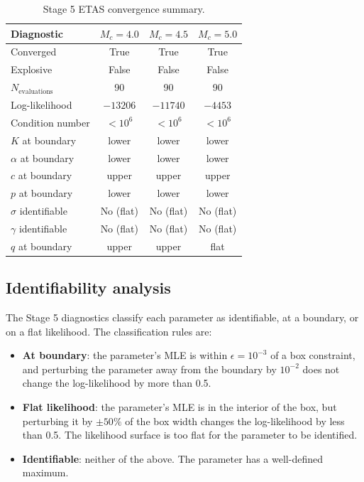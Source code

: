 \documentclass[10pt,a4paper,twocolumn]{article}
\begin{document}
\begin{table}[t]
\centering
\caption{Stage 5 ETAS convergence summary.}\label{tab:stage5-convergence}
\small
\begin{tabular*}{\columnwidth}{@{\extracolsep{\fill}}lccc}
\toprule
Diagnostic & $M_c=4.0$ & $M_c=4.5$ & $M_c=5.0$ \\
\midrule
Converged            & True & True & True \\
Explosive            & False & False & False \\
$N_{\text{evaluations}}$ & 90 & 90 & 90 \\
Log-likelihood       & $-13206$ & $-11740$ & $-4453$ \\
Condition number     & $<10^6$ & $<10^6$ & $<10^6$ \\
$K$ at boundary      & lower & lower & lower \\
$\alpha$ at boundary & lower & lower & lower \\
$c$ at boundary      & upper & upper & upper \\
$p$ at boundary      & lower & lower & lower \\
$\sigma$ identifiable & No (flat) & No (flat) & No (flat) \\
$\gamma$ identifiable & No (flat) & No (flat) & No (flat) \\
$q$ at boundary      & upper & upper & flat \\
\bottomrule
\end{tabular*}
\end{table}

\subsection{Identifiability analysis}

The Stage 5 diagnostics classify each parameter as identifiable, at a boundary, or on a flat likelihood. The classification rules are:

\begin{itemize}[leftmargin=1.2em,itemsep=2pt,topsep=2pt]
\item \textbf{At boundary}: the parameter's MLE is within $\epsilon = 10^{-3}$ of a box constraint, and perturbing the parameter away from the boundary by $10^{-2}$ does not change the log-likelihood by more than 0.5.
\item \textbf{Flat likelihood}: the parameter's MLE is in the interior of the box, but perturbing it by $\pm 50\%$ of the box width changes the log-likelihood by less than 0.5. The likelihood surface is too flat for the parameter to be identified.
\item \textbf{Identifiable}: neither of the above. The parameter has a well-defined maximum.
\end{itemize}
\end{document}
